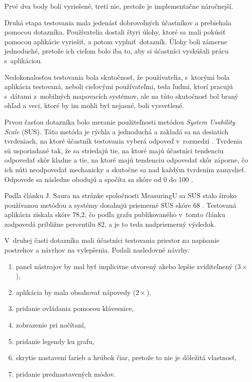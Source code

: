 Prvé dva body boli vyriešené, tretí nie, pretože je implementačne náročnejší.

Druhá etapa testovania mala jedenásť dobrovoľných účastníkov a prebiehala pomocou dotazníka. Používatelia dostali štyri úlohy, ktoré sa mali pokúsiť pomocou aplikácie vyriešiť, a potom vyplniť~dotazník. Úlohy boli zámerne jednoduché, pretože ich cieľom bolo iba to, aby si účastníci vyskúšali prácu s~aplikáciou.

Nedokonalosťou testovania bola skutočnosť, že používatelia, s~ktorými bola aplikácia testovaná, neboli cieľovými používateľmi, teda ľuďmi, ktorí pracujú s~dátami z~mobilných mapovacích systémov, ale na túto skutočnosť bol braný ohľad a veci, ktoré by im mohli byť nejasné, boli vysvetlené.

Prvou časťou dotazníka bolo meranie použiteľnosti metódou \emph{System Usability Scale} (SUS). Táto metóda je rýchla a jednoduchá a zakladá sa na desiatich tvrdeniach, na ktoré účastník testovania vyberá odpoveď v~rozmedzí . Tvrdenia sú usporiadané tak, že sa striedajú tie, na ktoré majú účastníci tendenciu odpovedať skôr kladne a tie, na ktoré majú tendenciu odpovedať skôr záporne, čo ich núti neodpovedať mechanicky a skutočne sa nad každým tvrdením zamyslieť. Odpovede sa následne obodujú a spočíta sa skóre od 0 do 100 \cite{brooke_sus}.

Podľa článku J. Saura na stránke spoločnosti MeasuringU sa SUS stalo široko používanou metódou a systémy dosahujú priemerné SUS skóre 68 \cite{sauro_sus}. Testovaná aplikácia získala skóre 78,2, čo podľa grafu publikovaného v~tomto článku zodpovedá približne percentilu 82, a je to teda nadpriemerný výsledok.

V~druhej časti dotazníka mali účastníci testovania priestor na napísanie postrehov a návrhov na vylepšenia. Podali nasledovné návrhy:
\begin{enumerate}
    \item panel nástrojov by mal byť implicitne otvorený akebo lepšie zviditeľnený ($3\times$),
    \item aplikácia by mala obsahovať nápovedy ($2\times$),
    \item pridanie ovládania pomocou klávesnice,
    \item zobrazenie  pri načítaní,
    \item pridanie legendy ku grafu,
    \item skrytie nastavení farieb a hrúbok čiar, pretože to nie je dôležitá vlastnosť,
    \item pridanie prednastavených módov.
\end{enumerate}

